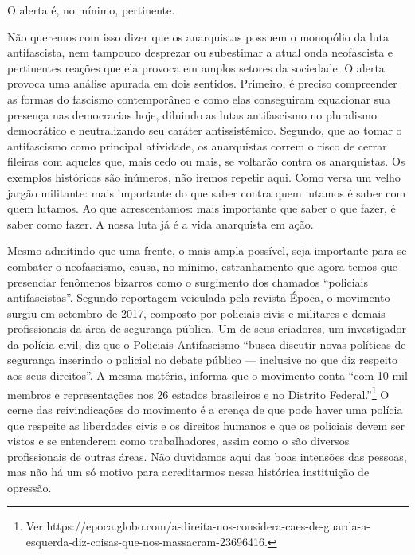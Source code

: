 O alerta é, no mínimo, pertinente.

Não queremos com isso dizer que os anarquistas possuem o monopólio da luta antifascista, nem tampouco desprezar ou subestimar a atual onda neofascista e pertinentes reações que ela provoca em amplos setores da sociedade. O alerta provoca uma análise apurada em dois sentidos. Primeiro, é preciso compreender as formas do fascismo contemporâneo e como elas conseguiram equacionar sua presença nas democracias hoje, diluindo as lutas antifascismo no pluralismo democrático e neutralizando seu caráter antissistêmico. Segundo, que ao tomar o antifascismo como principal atividade, os anarquistas correm o risco de cerrar fileiras com aqueles que, mais cedo ou mais, se voltarão contra os anarquistas. Os exemplos históricos são inúmeros, não iremos repetir aqui. Como versa um velho jargão militante: mais importante do que saber contra quem lutamos é saber com quem lutamos. Ao que acrescentamos: mais importante que saber o que fazer, é saber como fazer. A nossa luta já é a vida anarquista em ação.

Mesmo admitindo que uma frente, o mais ampla possível, seja importante para se combater o neofascismo, causa, no mínimo, estranhamento que agora temos que presenciar fenômenos bizarros como o surgimento dos chamados ``policiais antifascistas''. Segundo reportagem veiculada pela revista Época, o movimento surgiu em setembro de 2017, composto por policiais civis e militares e demais profissionais da área de segurança pública. Um de seus criadores, um investigador da polícia civil, diz que o Policiais Antifascismo ``busca discutir novas políticas de segurança inserindo o policial no debate público — inclusive no que diz respeito aos seus direitos''. A mesma matéria, informa que o movimento conta ``com 10 mil membros e representações nos 26 estados brasileiros e no Distrito Federal.''\footnote{Ver https://epoca.globo.com/a-direita-nos-considera-caes-de-guarda-a-esquerda-diz-coisas-que-nos-massacram-23696416.} O cerne das reivindicações do movimento é a crença de que pode haver uma polícia que respeite as liberdades civis e os direitos humanos e que os policiais devem ser vistos e se entenderem como trabalhadores, assim como o são diversos profissionais de outras áreas. Não duvidamos aqui das boas intensões das pessoas, mas não há um só motivo para acreditarmos nessa histórica instituição de opressão.

